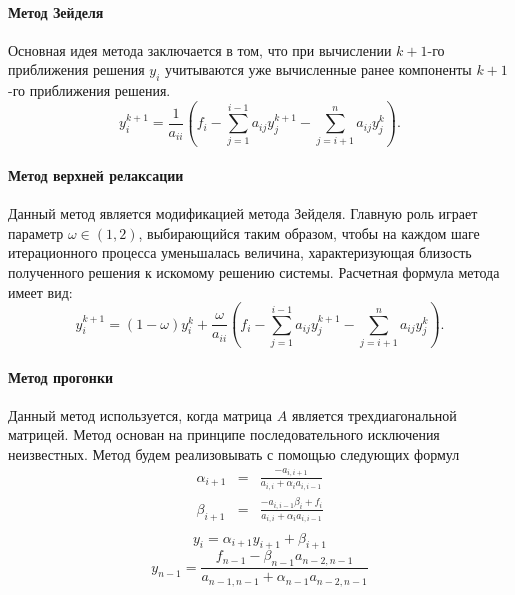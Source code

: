 \paragraph{Метод Зейделя}
Основная идея метода заключается в том, что при вычислении $k+1$-го приближения решения $y_i$ учитываются уже вычисленные ранее компоненты $k+1$-го приближения решения.
\begin{equation}
	y^{k+1}_i = \frac{1}{a_{i i}}\left(f_i - \sum^{i-1}_{j=1} a_{i j}y^{k+1}_j - \sum^n_{j=i+1} a_{i j}y^k_j \right).
\end{equation}

\paragraph{Метод верхней релаксации}
Данный метод является модификацией метода Зейделя. Главную роль играет параметр $\omega \in (1, 2)$, выбирающийся таким образом, чтобы на каждом шаге итерационного процесса уменьшалась величина, характеризующая близость полученного решения к искомому решению системы. Расчетная формула метода имеет вид:
\begin{equation}
	y^{k+1}_i = (1-\omega)y^k_i+\frac{\omega}{a_{i i}}\left(f_i - \sum^{i-1}_{j=1} a_{i j}y^{k+1}_j - \sum^n_{j=i+1} a_{i j}y^k_j \right).
\end{equation}

\paragraph{Метод прогонки}
Данный метод используется, когда матрица $A$ является трехдиагональной матрицей. Метод основан на принципе последовательного исключения неизвестных. Метод будем реализовывать с помощью следующих формул
\begin{equation}
	\begin{array}{rcl}
		\alpha_{i+1}&=&\frac{-a_{i, i+1}}{a_{i, i}+\alpha_i a_{i, i-1}}\\
		\beta_{i+1}&=&\frac{-a_{i, i-1}\beta_i+f_i}{a_{i, i}+\alpha_i a_{i, i-1}}\\
	\end{array}
\end{equation}
\begin{equation}
	y_i=\alpha_{i+1}y_{i+1} + \beta_{i+1}
\end{equation}
\begin{equation}
	y_{n-1}=\frac{f_{n-1} - \beta_{n-1}a_{n-2, n-1}}{a_{n-1, n-1}+\alpha_{n-1}a_{n-2, n-1}}
\end{equation}